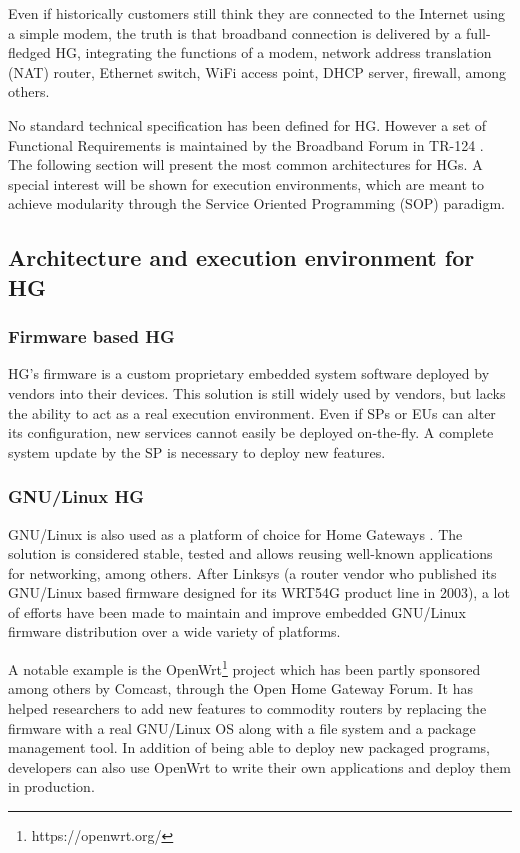 

Even if historically customers still think they are connected to the Internet using a simple modem, the truth is that broadband connection is delivered by a full-fledged HG, integrating the functions of a modem, network address translation (NAT) router, Ethernet switch, WiFi access point, DHCP server, firewall, among others.
 
No standard technical specification has been defined for HG. However a set of Functional Requirements is maintained by the Broadband Forum in TR-124 \cite{broadband_forum_functional_2014}.
The following section will present the most common architectures for HGs.
A special interest will be shown for execution environments, which are meant to achieve modularity through the Service Oriented Programming (SOP) paradigm.


\subsection{Architecture and execution environment for HG}

\subsubsection{Firmware based HG}
HG's firmware is a custom proprietary embedded system software deployed by vendors into their devices.
This solution is still widely used by vendors, but lacks the ability to act as a real execution environment.
Even if SPs or EUs can alter its configuration, new services cannot easily be deployed on-the-fly.
A complete system update by the SP is necessary to deploy new features.
   
\subsubsection{GNU/Linux HG}
   
GNU/Linux is also used as a platform of choice for Home Gateways \cite{royon_multiservice_2007}.
The solution is considered stable, tested and allows reusing well-known applications for networking, among others.
After Linksys (a router vendor who published its GNU/Linux based firmware designed for its WRT54G product line in 2003), a lot of efforts have been made to maintain and improve embedded GNU/Linux firmware distribution over a wide variety of platforms.

A notable example is the OpenWrt\footnote{https://openwrt.org/} project which has been partly sponsored among others by Comcast, through the Open Home Gateway Forum.
It has helped researchers to add new features to commodity routers by replacing the firmware with a real GNU/Linux OS along with a file system and a package management tool.
In addition of being able to deploy new packaged programs, developers can also use OpenWrt to write their own applications and deploy them in production.


